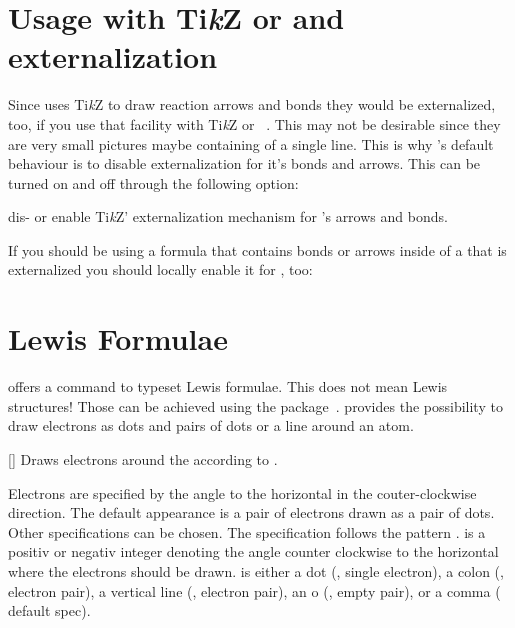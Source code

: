 \documentclass[load-preamble+]{cnltx-doc}
\newcommand*\TikZ{Ti\textit{k}Z}
\begin{document}
\section{Usage with \TikZ{} or  and externalization}
Since \chemformula{} uses \TikZ{} to draw reaction arrows
and bonds they would be externalized, too, if you use that facility with
\TikZ{} or ~\cite{pkg:pgfplots}.  This may not be
desirable since they are very small pictures maybe containing of a single
line.  This is why \chemformula's default behaviour is to disable
externalization for it's bonds and arrows.  This can be turned on and off
through the following option:
\begin{options}
    dis- or enable \TikZ' externalization mechanism for \chemformula's arrows
    and bonds.
\end{options}

If you should be using a formula that contains bonds or arrows inside of a
 that is externalized you should locally enable it for
\chemformula, too:

\begin{sourcecode}
\end{sourcecode}

\section{Lewis Formulae}\label{sec:lewis-formulae}
\chemformula{} offers a command to typeset Lewis formulae.
This does not mean Lewis structures!  Those can be achieved using the
 package~\cite{pkg:chemfig}.  \chemformula{} provides the
possibility to draw electrons as dots and pairs of dots or a line around an
atom.

\begin{commands}
  []
    Draws electrons around the  according to .
\end{commands}

Electrons are specified by the angle to the horizontal in the couter-clockwise
direction.  The default appearance is a pair of electrons drawn as a pair of
dots.  Other specifications can be chosen.  The specification follows the
pattern .   is a positiv or negativ
integer denoting the angle counter clockwise to the horizontal where the
electrons should be drawn.   is either a dot (, single
electron), a colon (\code{:}, electron pair), a vertical line (\code{|},
electron pair), an o (, empty pair), or a comma (\code{,} default
spec).
\end{document}
